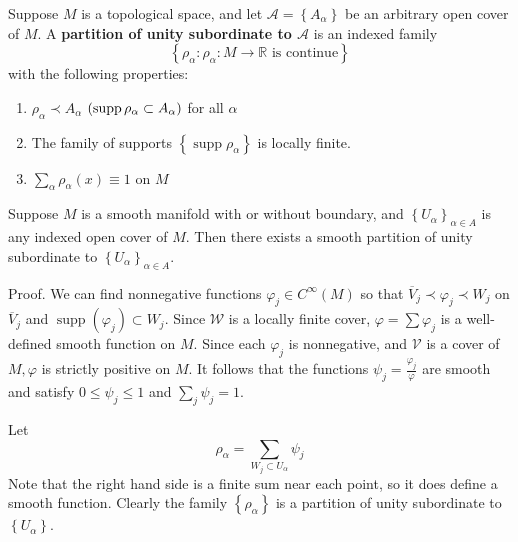 \documentclass[12pt, oneside]{book}
\begin{document}
\begin{definition}
    Suppose $M$ is a topological space, and let $\mathcal{A}=\left\{A_\alpha\right\}$ be an arbitrary open cover of $M$.
    A \textbf{partition of unity subordinate to $\mathcal{A}$} is an indexed family
    \begin{equation*}
        \left\{\rho_\alpha: \rho_\alpha: M \rightarrow \mathbb{R} \text{ is continue}\right\}
    \end{equation*}
    with the following properties:
    \begin{enumerate}[label=(\roman*)]
        \item $\rho_\alpha \prec A_\alpha$
              $(\operatorname{\operatorname{supp}} \rho_\alpha \subset A_\alpha)$ for all $\alpha$
        \item  The family of supports $\left\{\operatorname{supp} \rho_\alpha\right\}$ is locally finite.
        \item  $\sum_{\alpha} \rho_\alpha(x) \equiv 1$ on $M$
    \end{enumerate}
\end{definition}

\begin{theorem}
    Suppose $M$ is a smooth manifold with or without boundary, and $\left\{U_\alpha\right\}_{\alpha \in A}$ is any indexed open cover of $M$. Then there exists a smooth partition of unity subordinate to $\left\{U_\alpha\right\}_{\alpha \in A}$.

    Proof.
    We can find nonnegative functions $\varphi_j \in C^{\infty}(M)$ so that $\overline{V}_j\prec\varphi_j \prec  W_j$ on $\overline{V}_j$ and $\operatorname{supp}\left(\varphi_j\right) \subset W_j$.
    Since $\mathcal{W}$ is a locally finite cover, $\varphi=\sum \varphi_j$ is a well-defined smooth function on $M$. Since each $\varphi_j$ is nonnegative, and $\mathcal{V}$ is a cover of $M, \varphi$ is strictly positive on $M$. It follows that the functions $\psi_j=\frac{\varphi_j}{\varphi}$ are smooth and satisfy $0 \leq \psi_j \leq 1$ and $\sum_j \psi_j=1$.

    Let
    \begin{equation*}
        \rho_\alpha=\sum_{W_j \subset U_\alpha} \psi_j
    \end{equation*}
    Note that the right hand side is a finite sum near each point, so it does define a smooth function. Clearly the family $\left\{\rho_\alpha\right\}$ is a partition of unity subordinate to $\left\{U_\alpha\right\}$.
\end{theorem}
\end{document}
